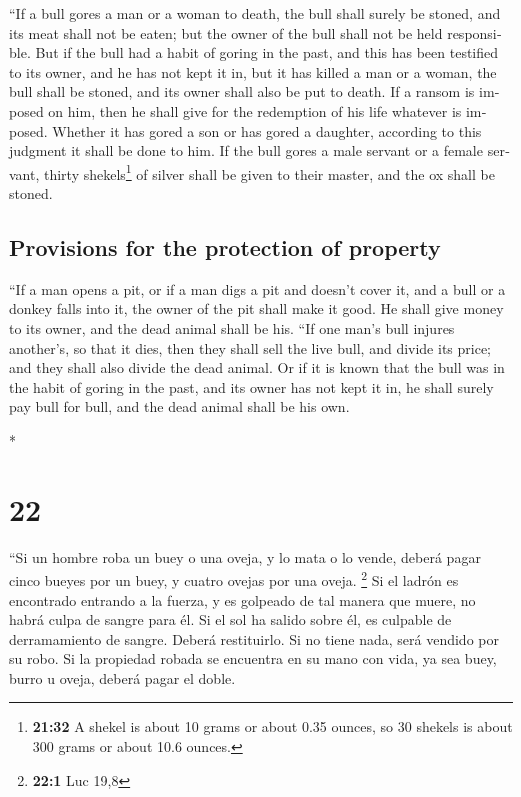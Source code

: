 \begin{paracol}{2}
\begin{otherlanguage}{english}
 ``If a bull gores a man or a woman to death, the bull
shall surely be stoned, and its meat shall not be eaten; but the owner
of the bull shall not be held responsible.  But if the
bull had a habit of goring in the past, and this has been testified to
its owner, and he has not kept it in, but it has killed a man or a
woman, the bull shall be stoned, and its owner shall also be put to
death.  If a ransom is imposed on him, then he shall give
for the redemption of his life whatever is imposed. 
Whether it has gored a son or has gored a daughter, according to this
judgment it shall be done to him.  If the bull gores a
male servant or a female servant, thirty shekels\footnote{\textbf{21:32}
  A shekel is about 10 grams or about 0.35 ounces, so 30 shekels is
  about 300 grams or about 10.6 ounces.} of silver shall be given to
their master, and the ox shall be stoned.

\hypertarget{provisions-for-the-protection-of-property}{%
\subsection{Provisions for the protection of
property}\label{provisions-for-the-protection-of-property}}

 ``If a man opens a pit, or if a man digs a pit and
doesn't cover it, and a bull or a donkey falls into it, 
the owner of the pit shall make it good. He shall give money to its
owner, and the dead animal shall be his.  ``If one man's
bull injures another's, so that it dies, then they shall sell the live
bull, and divide its price; and they shall also divide the dead animal.
 Or if it is known that the bull was in the habit of
goring in the past, and its owner has not kept it in, he shall surely
pay bull for bull, and the dead animal shall be his own.

\end{otherlanguage}

\switchcolumn[0]*

\hypertarget{section-42}{%
\section{22}\label{section-42}}

 ``Si un hombre roba un buey o una oveja, y lo mata o lo
vende, deberá pagar cinco bueyes por un buey, y cuatro ovejas por una
oveja. \footnote{\textbf{22:1} Luc 19,8}  Si el ladrón es
encontrado entrando a la fuerza, y es golpeado de tal manera que muere,
no habrá culpa de sangre para él.  Si el sol ha salido
sobre él, es culpable de derramamiento de sangre. Deberá restituirlo. Si
no tiene nada, será vendido por su robo.  Si la propiedad
robada se encuentra en su mano con vida, ya sea buey, burro u oveja,
deberá pagar el doble.


\end{paracol}
